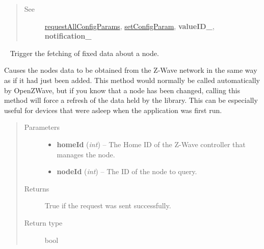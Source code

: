 \documentclass[letterpaper,10pt,english]{sphinxmanual}
\begin{document}
\begin{fulllineitems}
\begin{fulllineitems}
\begin{quote}
\begin{description}
\begin{itemize}
\end{itemize}

\item[{See}] \leavevmode
{\hyperref[libopenzwave:requestallconfigparams]{requestAllConfigParams}}, {\hyperref[libopenzwave:setconfigparam]{setConfigParam}}, {\color{red}\bfseries{}valueID\_}, {\color{red}\bfseries{}notification\_}

\end{description}\end{quote}

\end{fulllineitems}


\begin{fulllineitems}
\label{libopenzwave:libopenzwave.PyManager.requestNodeDynamic}~\label{libopenzwave:requestnodedynamic}
Trigger the fetching of fixed data about a node.

Causes the nodes data to be obtained from the Z-Wave network in the same way
as if it had just been added.  This method would normally be called
automatically by OpenZWave, but if you know that a node has been changed,
calling this method will force a refresh of the data held by the library.  This
can be especially useful for devices that were asleep when the application was
first run.
\begin{quote}\begin{description}
\item[{Parameters}] \leavevmode\begin{itemize}
\item {} 
\textbf{homeId} (\emph{int}) -- The Home ID of the Z-Wave controller that manages the node.

\item {} 
\textbf{nodeId} (\emph{int}) -- The ID of the node to query.

\end{itemize}

\item[{Returns}] \leavevmode
True if the request was sent successfully.

\item[{Return type}] \leavevmode
bool

\end{description}\end{quote}

\end{fulllineitems}


\end{fulllineitems}
\end{document}
